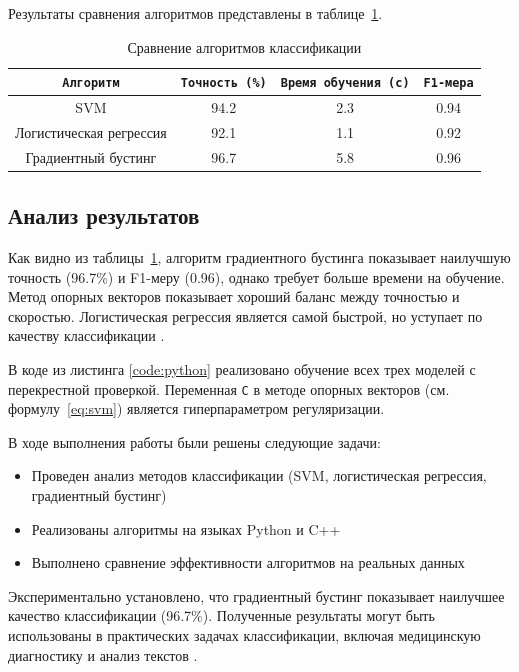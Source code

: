 \documentclass[coursework]{SCWorks}
\begin{document}
Результаты сравнения алгоритмов представлены в таблице~\ref{tab:results}.

\begin{table}[ht]
\caption{Сравнение алгоритмов классификации}
\centering
\begin{tabular}{|c|c|c|c|}
\hline
\texttt{Алгоритм} & \texttt{Точность (\%)} & \texttt{Время обучения (с)} & \texttt{F1-мера} \\
\hline
SVM & 94.2 & 2.3 & 0.94 \\
Логистическая регрессия & 92.1 & 1.1 & 0.92 \\
Градиентный бустинг & 96.7 & 5.8 & 0.96 \\
\hline
\end{tabular}
\label{tab:results}
\end{table}

\subsection{Анализ результатов}

Как видно из таблицы~\ref{tab:results}, алгоритм градиентного бустинга показывает наилучшую точность (96.7\%) и F1-меру (0.96), однако требует больше времени на обучение. Метод опорных векторов показывает хороший баланс между точностью и скоростью. Логистическая регрессия является самой быстрой, но уступает по качеству классификации \cite{attention}.

В коде из листинга \ref{code:python} реализовано обучение всех трех моделей с перекрестной проверкой. Переменная \texttt{C} в методе опорных векторов (см. формулу~\ref{eq:svm}) является гиперпараметром регуляризации.

\conclusion

В ходе выполнения работы были решены следующие задачи:
\begin{itemize}
    \item Проведен анализ методов классификации (SVM, логистическая регрессия, градиентный бустинг)
    \item Реализованы алгоритмы на языках Python и C++
    \item Выполнено сравнение эффективности алгоритмов на реальных данных
\end{itemize}

Экспериментально установлено, что градиентный бустинг показывает наилучшее качество классификации (96.7\%). Полученные результаты могут быть использованы в практических задачах классификации, включая медицинскую диагностику и анализ текстов \cite{classification_sound}.



\end{document}

